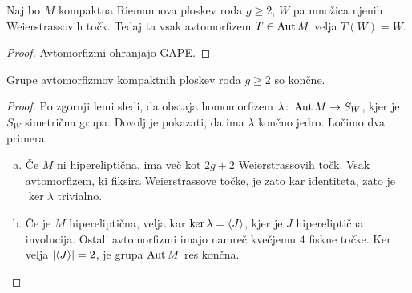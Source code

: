 \begin{lema}
Naj bo $M$ kompaktna Riemannova ploskev roda $g \geq 2$, $W$ pa
množica njenih Weierstrassovih točk. Tedaj ta vsak avtomorfizem
$T \in \operatorname{Aut} M$ velja $T(W) = W$.
\end{lema}

\begin{proof}
Avtomorfizmi ohranjajo GAPE.
\end{proof}

\begin{izrek}[Schwarz]
Grupe avtomorfizmov kompaktnih ploskev roda $g \geq 2$ so končne.
\end{izrek}

\begin{proof}
Po zgornji lemi sledi, da obstaja homomorfizem
$\lambda \colon \operatorname{Aut} M \to S_W$, kjer je $S_W$ simetrična grupa.
Dovolj je pokazati, da ima $\lambda$ končno jedro. Ločimo dva
primera.

\begin{enumerate}[a)]
\item Če $M$ ni hipereliptična, ima več kot $2g + 2$
Weierstrassovih točk. Vsak avtomorfizem, ki fiksira Weierstrassove
točke, je zato kar identiteta, zato je $\ker \lambda$ trivialno.

\item Če je $M$ hipereliptična, velja kar
$\ker \lambda = \left\langle J\right\rangle$, kjer je $J$ hipereliptična involucija.
Ostali avtomorfizmi imajo namreč kvečjemu $4$ fiskne točke. Ker
velja $\left\lvert \left\langle J\right\rangle\right\rvert = 2$, je grupa $\operatorname{Aut} M$ res končna. \qedhere
\end{enumerate}
\end{proof}

